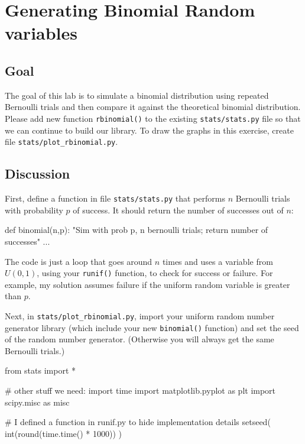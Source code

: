 \chapter{Generating Binomial Random variables}

\setcounter{problem}{1}
\section{Goal}

\begin{fullwidth}

The goal of this lab is to simulate a binomial distribution using repeated Bernoulli trials and then compare it against the theoretical binomial distribution. Please add new function {\tt rbinomial()} to the existing {\tt stats/stats.py} file so that we can continue to build our library. To draw the graphs in this exercise, create file {\tt stats/plot\_rbinomial.py}.

\section{Discussion}

\step First, define a function in file {\tt stats/stats.py} that performs $n$ Bernoulli trials with probability $p$ of success. It should return the number of successes out of $n$:

\begin{pyverbatim}
def binomial(n,p):
    "Sim with prob p, n bernoulli trials; return number of successes"
    ...
\end{pyverbatim}

The code is just a loop that goes around $n$ times and uses a variable from $U(0,1)$, using your {\tt runif()} function, to check for success or failure. For example, my solution assumes failure if the uniform random variable is greater than $p$.
    
\step Next, in {\tt stats/plot\_rbinomial.py}, import your uniform random number generator library (which include your new {\tt binomial()} function) and set the seed of the random number generator. (Otherwise you will always get the same Bernoulli trials.) 

\begin{pyverbatim}
from stats import *

# other stuff we need:
import time
import matplotlib.pyplot as plt
import scipy.misc as misc

# I defined a function in runif.py to hide implementation details
setseed( int(round(time.time() * 1000)) )
\end{pyverbatim}


\end{fullwidth}
